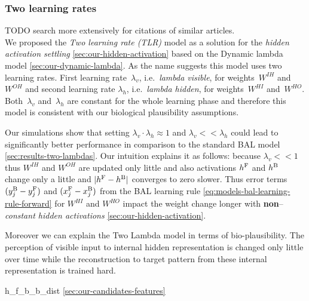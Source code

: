
\subsubsection{Two learning rates} 
\label{sec:our-two-lambdas}

TODO search more extensively for citations of similar articles. \\

We proposed the \emph{Two learning rate (TLR)} model as a solution for the \emph{hidden activation settling} \ref{sec:our-hidden-activation} based on the Dynamic lambda model \ref{sec:our-dynamic-lambda}. As the name suggests this model uses two learning rates. First learning rate~$\lambda_v$, i.e.~\emph{lambda visible}, for weights~$W^{IH}$ and~$W^{OH}$ and second learning rate $\lambda_h$, i.e.~\emph{lambda hidden}, for weights~$W^{HI}$ and~$W^{HO}$. Both~$\lambda_v$ and~$\lambda_h$ are constant for the whole learning phase and therefore this model is consistent with our biological plausibility assumptions. 

Our simulations show that setting $\lambda_v \cdot \lambda_h \approx 1$ and $\lambda_v << \lambda_h$ could lead to significantly better performance in comparison to the standard BAL model \ref{sec:results-two-lambdas}. Our intuition explains it as follows: because $\lambda_v << 1$ thus $W^{IH}$ and $W^{OH}$ are updated only little and also activations $h^{\rm F}$ and $h^{\rm B}$ change only a little and $|h^{\rm F}- h^{\rm B}|$ converges to zero slower. Thus error terms $(y_j^{\rm B} - y_j^{\rm F})$ and $(x_j^{\rm F} - x_j^{\rm B})$ from the BAL learning rule \ref{eq:models-bal-learning-rule-forward} for $W^{HI}$ and $W^{HO}$ impact the weight change longer with {\bf non}--\emph{constant hidden activations} \ref{sec:our-hidden-activation}. 

Moreover we can explain the Two Lambda model in terms of bio-plausibility. The perception of visible input to internal hidden representation is changed only little over time while the reconstruction to target pattern from these internal representation is trained hard. 

h\_f\_b\_b\_dist \ref{sec:our-candidates-features}


